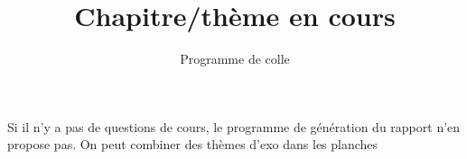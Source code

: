 \documentclass{planchedecolle}
\title{Chapitre/thème en cours}
\date{Programme de colle}
\begin{document}
\planche
{}\stopcours


\planche[NomDePlanche]

Si il n'y a pas de questions de cours, le programme de génération du rapport n'en propose pas. On peut combiner des thèmes d'exo dans les planches


\pageReponses
\end{document}
